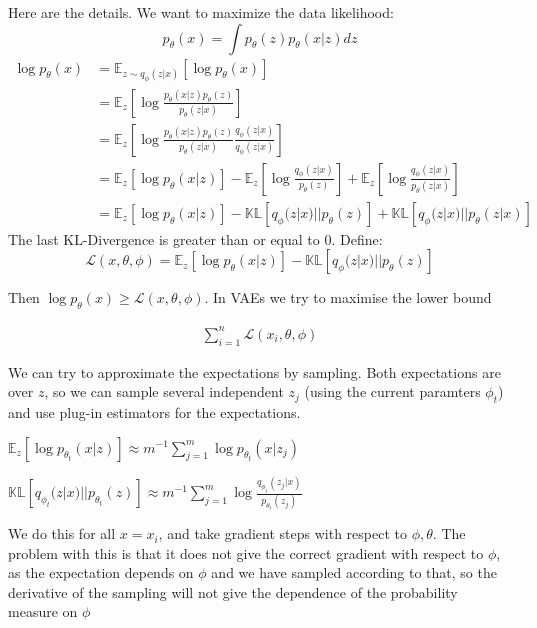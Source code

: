 \documentclass[english]{article}
\begin{document}
Here are the details. We want to maximize the data likelihood:
\begin{equation*}
	p_{\theta}(x) = \int p_{\theta}(z)p_{\theta}(x|z)dz
\end{equation*}
\begin{align*}
	\log p_{\theta}(x) &= \mathbb{E}_{z\sim q_{\phi}(z|x)}[\log p_{\theta}(x)]\\
	&=\mathbb{E}_{z}[\log\frac{p_{\theta}(x|z)p_{\theta}(z)}{p_{\theta}(z|x)}]\\
	&=\mathbb{E}_{z}[\log\frac{p_{\theta}(x|z)p_{\theta}(z)}{p_{\theta}(z|x)}\frac{q_{\phi}(z|x)}{q_{\phi}(z|x)}]\\
	&=\mathbb{E}_{z}[\log p_{\theta}(x|z)] - \mathbb{E}_{z}[\log\frac{q_{\phi}(z|x)}{p_{\theta}(z)}] + \mathbb{E}_{z}[\log\frac{q_{\phi}(z|x)}{p_{\theta}(z|x)}]\\
	&=\mathbb{E}_{z}[\log p_{\theta}(x|z)] - \mathbb{KL}[q_{\phi}(z|x)||p_{\theta}(z)] + \mathbb{KL}[q_{\phi}(z|x)||p_{\theta}(z|x)]
\end{align*}
The last KL-Divergence is greater than or equal to 0. Define:
\begin{equation*}
	\mathcal{L}(x, \theta, \phi) = \mathbb{E}_{z}[\log p_{\theta}(x|z)] - \mathbb{KL}[q_{\phi}(z|x)||p_{\theta}(z)]
\end{equation*}

Then $\log p_{\theta}(x) \geq \mathcal{L}(x, \theta, \phi)$. 
In VAEs we try to maximise the lower bound

\begin{align*}
\sum_{i=1}^n \mathcal{L}(x_i, \theta, \phi)
\end{align*}

We can try to approximate the expectations by sampling. Both expectations are over $z$, so we can sample several independent $z_j$ (using the current paramters $\phi_t$) and use plug-in estimators for the expectations. 


$\mathbb{E}_{z}[\log p_{\theta_t}(x|z)]
\approx
m^{-1}\sum_{j=1}^m \log p_{\theta_t}(x|z_j)
$

$
\mathbb{KL}[q_{\phi_t}(z|x)||p_{\theta_t}(z)]\approx
m^{-1}\sum_{j=1}^m
\log\frac{q_{\phi_t}(z_j|x)}{p_{\theta_t}(z_j)}
$

We do this for all $x=x_i$, and take gradient steps with respect to $\phi,\theta$. The problem with this is that it does not give the correct gradient with respect to $\phi$, as the expectation depends on $\phi$ and we have sampled according to that, so the derivative of the sampling will not give the dependence of the probability measure on $\phi$
\end{document}
